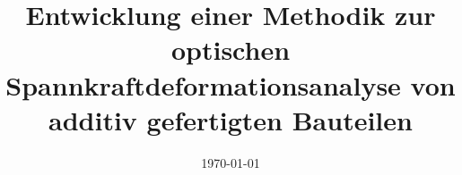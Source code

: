 \documentclass[t, aspectratio=169]{beamer}
\begin{document}
\title[]{Entwicklung einer Methodik zur optischen Spannkraftdeformationsanalyse von additiv gefertigten Bauteilen}
\date{\today}
\begin{frame}
  \vspace{2cm}
  \maketitle
  \vspace{1.5cm}  
\end{frame}








\end{document}
